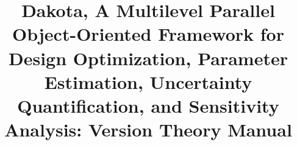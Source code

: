 \documentclass[ps2pdf,11pt,report,blank]{SANDreport}
\title{Dakota, A Multilevel Parallel Object-Oriented Framework for 
Design Optimization, Parameter Estimation, Uncertainty Quantification, 
and Sensitivity Analysis: Version \DakotaVersion\space Theory Manual}
\begin{document}
\maketitle
\begin{abstract}
\DakotaAbstractShared
\DakotaAbstractTheory
\end{abstract}


\SANDmain 






\begin{SANDdistribution}[NM]





\end{SANDdistribution}

\end{document}

